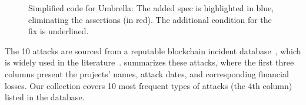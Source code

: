 \begin{figure}[t]

\caption{Simplified code for Umbrella: The added \lang spec is highlighted in blue, 
eliminating the assertions (in red). The additional condition for the fix is underlined.}
\label{fig:integer}
\end{figure}










The 10 attacks are sourced from a reputable blockchain incident database~\cite{defihacklabs},
which is widely used in the literature~\cite{DBLP:conf/icse/ZhangZXL23,DBLP:conf/icis/KeN22,DBLP:journals/iacr/ZhouXECWWQWSG22}.
 summarizes these attacks,
where the first three columns present the projects' names, attack dates, and corresponding financial losses.
Our collection covers 10 most frequent types of attacks (the 4th column) 
listed in the database.

